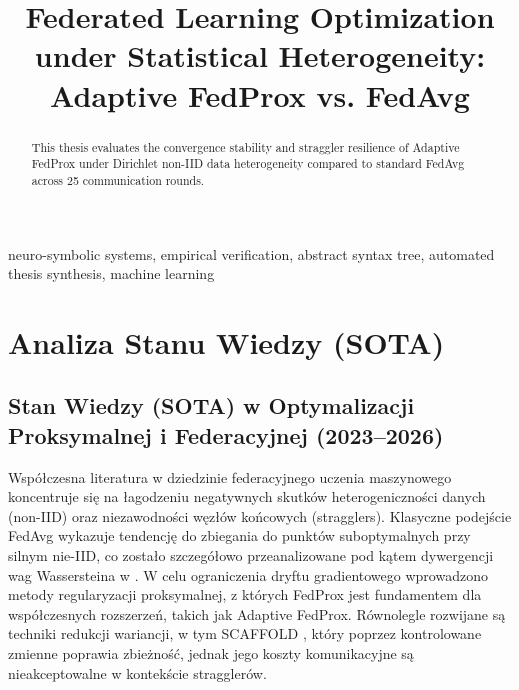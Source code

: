 \documentclass[conference]{IEEEtran}
\begin{document}
\title{Federated Learning Optimization under Statistical Heterogeneity: Adaptive FedProx vs. FedAvg}

\author{
}


\thispagestyle{plain}

\begin{abstract}
This thesis evaluates the convergence stability and straggler resilience of Adaptive FedProx under Dirichlet non-IID data heterogeneity compared to standard FedAvg across 25 communication rounds.
\end{abstract}

\begin{IEEEkeywords}
neuro-symbolic systems, empirical verification, abstract syntax tree, automated thesis synthesis, machine learning
\end{IEEEkeywords}

\section{Analiza Stanu Wiedzy (SOTA)}
\subsection{Stan Wiedzy (SOTA) w Optymalizacji Proksymalnej i Federacyjnej (2023--2026)}

Współczesna literatura w dziedzinie federacyjnego uczenia maszynowego koncentruje się na łagodzeniu negatywnych skutków heterogeniczności danych (non-IID) oraz niezawodności węzłów końcowych (stragglers). Klasyczne podejście FedAvg \cite{mcmahan2017communication} wykazuje tendencję do zbiegania do punktów suboptymalnych przy silnym nie-IID, co zostało szczegółowo przeanalizowane pod kątem dywergencji wag Wassersteina w \cite{zhao2023noniid}. W celu ograniczenia dryftu gradientowego wprowadzono metody regularyzacji proksymalnej, z których FedProx \cite{li2020federated} jest fundamentem dla współczesnych rozszerzeń, takich jak Adaptive FedProx. Równolegle rozwijane są techniki redukcji wariancji, w tym SCAFFOLD \cite{karimireddy2020scaffold}, który poprzez kontrolowane zmienne poprawia zbieżność, jednak jego koszty komunikacyjne są nieakceptowalne w kontekście stragglerów.
\end{document}
